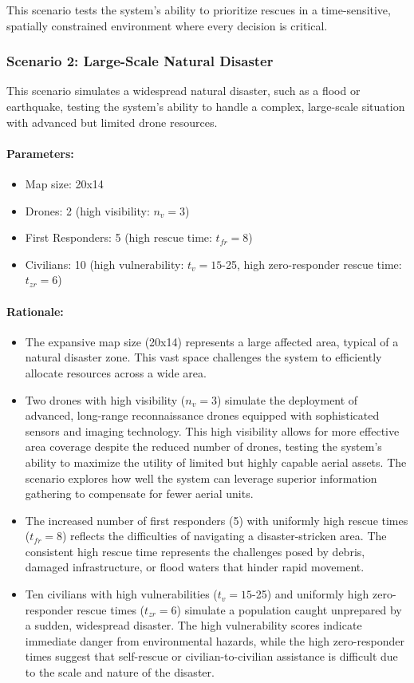 This scenario tests the system's ability to prioritize rescues in a time-sensitive, spatially constrained environment where every decision is critical.

\subsubsection{Scenario 2: Large-Scale Natural Disaster}

This scenario simulates a widespread natural disaster, such as a flood or earthquake, testing the system's ability to handle a complex, large-scale situation with advanced but limited drone resources.

\paragraph{Parameters:}
\begin{itemize}
	\item Map size: 20x14
	\item Drones: 2 (high visibility: $n_v = 3$)
	\item First Responders: 5 (high rescue time: $t_{fr} = 8$)
	\item Civilians: 10 (high vulnerability: $t_v = 15$-25, high zero-responder rescue time: $t_{zr} = 6$)
\end{itemize}

\paragraph{Rationale:}
\begin{itemize}
	\item The expansive map size (20x14) represents a large affected area, typical of a natural disaster zone. This vast space challenges the system to efficiently allocate resources across a wide area.
	\item Two drones with high visibility ($n_v = 3$) simulate the deployment of advanced, long-range reconnaissance drones equipped with sophisticated sensors and imaging technology. This high visibility allows for more effective area coverage despite the reduced number of drones, testing the system's ability to maximize the utility of limited but highly capable aerial assets. The scenario explores how well the system can leverage superior information gathering to compensate for fewer aerial units.
	\item The increased number of first responders (5) with uniformly high rescue times ($t_{fr} = 8$) reflects the difficulties of navigating a disaster-stricken area. The consistent high rescue time represents the challenges posed by debris, damaged infrastructure, or flood waters that hinder rapid movement.
	\item Ten civilians with high vulnerabilities ($t_v = 15$-25) and uniformly high zero-responder rescue times ($t_{zr} = 6$) simulate a population caught unprepared by a sudden, widespread disaster. The high vulnerability scores indicate immediate danger from environmental hazards, while the high zero-responder times suggest that self-rescue or civilian-to-civilian assistance is difficult due to the scale and nature of the disaster.
\end{itemize}


